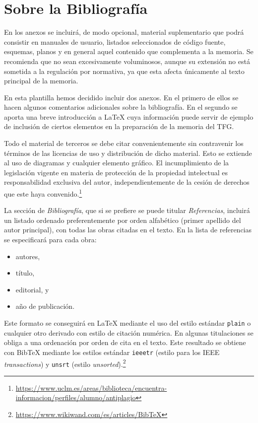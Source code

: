 \chapter{Sobre la Bibliografía}
\label{cap:AnexoA}

En los anexos se incluirá, de modo opcional, material suplementario que podrá consistir en manuales de usuario, listados seleccionados de código fuente, esquemas, planos y en general aquel contenido que complementa a la memoria. Se recomienda que no sean excesivamente voluminosos, aunque su extensión no está sometida a la regulación por normativa, ya que esta afecta únicamente al texto principal de la memoria.

En esta plantilla hemos decidido incluir dos anexos. En el primero de ellos se hacen algunos comentarios adicionales sobre la bibliografía. En el segundo se aporta una breve introducción a \LaTeX{} cuya información puede servir de ejemplo de inclusión de ciertos elementos en la preparación de la memoria del TFG.

Todo el material de terceros se debe citar convenientemente sin contravenir los términos de las licencias de uso y distribución de dicho material. Esto se extiende al uso de diagramas y cualquier elemento gráfico. El incumplimiento de la legislación vigente en materia de protección de la propiedad intelectual es responsabilidad exclusiva del autor, independientemente de la cesión de derechos que este haya convenido.\footnote{\url{https://www.uclm.es/areas/biblioteca/encuentra-informacion/perfiles/alumno/antiplagio}}

La sección de \emph{Bibliografía}, que si se prefiere se puede titular \emph{Referencias}, incluirá un listado ordenado preferentemente por orden alfabético (primer apellido del autor principal), con todas las obras citadas en el texto. En la lista de referencias se especificará para cada obra: 
\begin{itemize}
	\item autores, 
	\item título, 
	\item editorial, y 
	\item año de publicación.
\end{itemize} 

Este formato se conseguirá en \LaTeX{} mediante el uso del estilo estándar \texttt{plain} o cualquier otro derivado con estilo de citación numérica. En algunas titulaciones se obliga a una ordenación por orden de cita en el texto. Este resultado se obtiene con Bib\TeX{} mediante los estilos estándar \texttt{ieeetr} (estilo para los IEEE \emph{transactions}) y \texttt{unsrt} (estilo \emph{unsorted}).\footnote{\url{https://www.wikiwand.com/es/articles/BibTeX}}

